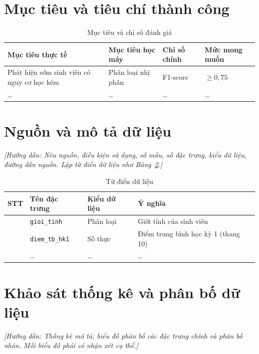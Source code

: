\documentclass[12pt,a4paper,oneside]{report}
\newcommand{\huongdan}[1]{{\color{guide}\itshape [Hướng dẫn: #1]}}
\begin{document}
\section{Mục tiêu và tiêu chí thành công}

\begin{table}[H]
  \centering
  \caption{Mục tiêu và chỉ số đánh giá}
  \label{tab:muctieu}
  \begin{tabularx}{\textwidth}{>{\raggedright\arraybackslash}X >{\raggedright\arraybackslash}X
                               >{\centering\arraybackslash}p{2.8cm} >{\centering\arraybackslash}p{2.8cm}}
    \toprule
    \textbf{Mục tiêu thực tế} & \textbf{Mục tiêu học máy} & \textbf{Chỉ số chính} & \textbf{Mức mong muốn} \\
    \midrule
    Phát hiện sớm sinh viên có nguy cơ học kém & Phân loại nhị phân & F1-score & $\geq 0{,}75$ \\
    \dots & \dots & \dots & \dots \\
    \bottomrule
  \end{tabularx}
\end{table}

\section{Nguồn và mô tả dữ liệu}
\huongdan{Nêu nguồn, điều kiện sử dụng, số mẫu, số đặc trưng, kiểu dữ liệu,
đường dẫn nguồn. Lập từ điển dữ liệu như Bảng~\ref{tab:tudien}.}

\begin{table}[H]
  \centering
  \caption{Từ điển dữ liệu}
  \label{tab:tudien}
  \begin{tabularx}{\textwidth}{>{\centering\arraybackslash}p{1cm} p{3.4cm} p{2.4cm} X}
    \toprule
    \textbf{STT} & \textbf{Tên đặc trưng} & \textbf{Kiểu dữ liệu} & \textbf{Ý nghĩa} \\
    \midrule
    1 & \texttt{gioi\_tinh}  & Phân loại & Giới tính của sinh viên \\
    2 & \texttt{diem\_tb\_hk1} & Số thực  & Điểm trung bình học kỳ 1 (thang 10) \\
    3 & \dots & \dots & \dots \\
    \bottomrule
  \end{tabularx}
\end{table}

\section{Khảo sát thống kê và phân bố dữ liệu}
\huongdan{Thống kê mô tả; biểu đồ phân bố các đặc trưng chính và phân bố nhãn.
Mỗi biểu đồ phải có nhận xét cụ thể.}
\end{document}
